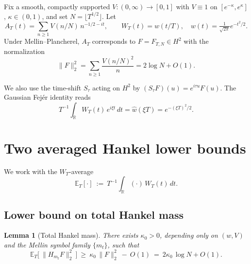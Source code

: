 \documentclass[11pt]{article}
\theoremstyle{plain}
\newtheorem{lemma}[theorem]{Lemma}
\theoremstyle{definition}
\numberwithin{equation}{section}
\begin{document}
\medskip

Fix a smooth, compactly supported $V:(0,\infty)\to[0,1]$ with $V\equiv1$ on $[e^{-\kappa},e^\kappa]$, $\kappa\in(0,1)$, and set $N=\lfloor T^{1/2}\rfloor$. Let
\[
A_T(t)=\sum_{n\ge1} V(n/N)\,n^{-1/2-it},\qquad
W_T(t)=w(t/T),\quad w(t)=\tfrac{1}{\sqrt{2\pi}}e^{-t^2/2}.
\]
Under Mellin--Plancherel, $A_T$ corresponds to $F=F_{T,N}\in H^2$ with the normalization
\begin{equation}\label{eq:F-norm}
\|F\|_2^2=\sum_{n\ge1}\frac{V(n/N)^2}{n}=2\log N+O(1).
\end{equation}

We also use the time-shift $S_\tau$ acting on $H^2$ by $(S_\tau F)(u)=e^{i\tau u}F(u)$.
The Gaussian Fejér identity reads
\begin{equation}\label{eq:fejer}
T^{-1}\!\int_{\mathbb R} W_T(t)\,e^{i\xi t}\,dt=\widehat w(\xi T)=e^{-(\xi T)^2/2}.
\end{equation}

\section{Two averaged Hankel lower bounds}

We work with the $W_T$-average
\[
\mathbb E_T[\cdot]\ :=\ T^{-1}\!\int_{\mathbb R} (\cdot)\,W_T(t)\,dt.
\]

\subsection{Lower bound on total Hankel mass}

\begin{lemma}[Total Hankel mass]\label{lem:total-hankel}
There exists $\kappa_0>0$, depending only on $(w,V)$ and the Mellin symbol family $\{m_t\}$, such that
\begin{equation}\label{eq:total-hankel}
\mathbb E_T\big[\ \|H_{m_t}F\|_2^2\ \big]\ \ge\ \kappa_0\,\|F\|_2^2\ -\ O(1)\ =\ 2\kappa_0\,\log N + O(1).
\end{equation}
\end{lemma}
\end{document}
